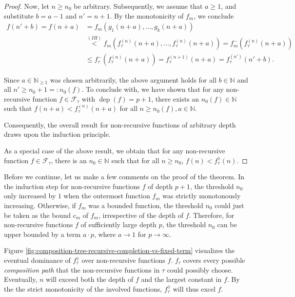\begin{proof}
	Now, let $n\geq n_0$ be arbitrary. 
	Subsequently, we assume that $a\geq 1$, and substitute $b=a-1$ and $n'=n+1$.
	By the monotonicity of $f_m$, we conclude
	\begin{align}
		\label{eq:theorem:recursive-completion-not-non-recursive-expressible-induction-step}
		f(n'+b)=f(n+a)&=f_m(g_1(n+a),\dots,g_k(n+a))\\
		&\overset{(IH)}{<}f_m(f_\tau^{(n)}(n+a),\dots,f_\tau^{(n)}(n+a))=f_m^{-}(f_\tau^{(n)}(n+a))\\
		&\leq f_\tau^{-}(f_\tau^{(n)}(n+a))=f_{\tau}^{(n+1)}(n+a)=f_{\tau}^{(n')}(n'+b).
	\end{align}
	
	Since $a\in\mathbb{N}_{\geq 1}$ was chosen arbitrarily, the above argument holds for all $b\in\mathbb{N}$ and all $n'\geq n_0+1=:n_0(f)$. 
	To conclude with, we have shown that for any non-recursive function $f\in \mathcal{F}_{\tau}$ with $\operatorname{dep}(f)=p+1$, there exists an $n_0(f)\in\mathbb{N}$ such that $f(n+a)<f_\tau^{(n)}(n+a)$ for all $n\geq n_0(f),a\in\mathbb{N}$.
	
	Consequently, the overall result for non-recursive functions of arbitrary depth draws upon the induction principle.
	
	As a special case of the above result, we obtain that for any non-recursive function $f\in \mathcal{F}_{\tau}$, there is an $n_0\in\mathbb{N}$ such that for all $n\geq n_0$, $f(n)<f_{\tau}^{\lozenge}(n)$.
	
\end{proof}

Before we continue, let us make a few comments on the proof of the theorem.
In the induction step for non-recursive functions $f$ of depth $p+1$, the threshold $n_0$ only increased by $1$ when the outermost function $f_m$ was strictly monotonously increasing. 
Otherwise, if $f_m$ was a bounded function, the threshold $n_0$ could just be taken as the bound $c_m$ of $f_m$, irrespective of the depth of $f$.
Therefore, for non-recursive functions $f$ of sufficiently large depth $p$, the threshold $n_0$ can be upper bounded by a term $a\cdot p$, where $a\to 1$ for $p\to\infty$.  

Figure \ref{fig:composition-tree-recursive-completion-vs-fixed-term} visualizes the eventual dominance of $f_{\tau}^{\lozenge}$ over non-recursive functions $f$.
$f_{\tau}$ covers every possible \textit{composition path} that the non-recursive functions in $\tau$ could possibly choose. Eventually, $n$ will exceed both the depth of $f$ and the largest constant in $f$. By the the strict monotonicity of the involved functions, $f_{\tau}^{\lozenge}$ will thus excel $f$.

